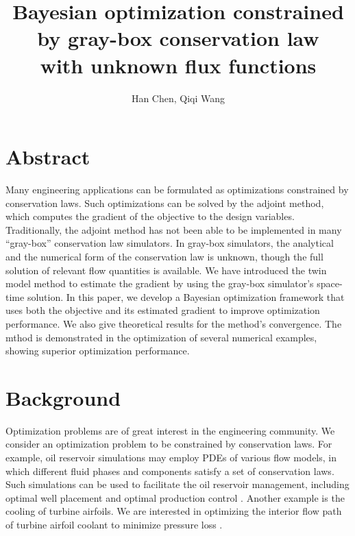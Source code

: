 \documentclass[a4paper,onecolumn]{article}
\theoremstyle{remark}
\begin{document}
\title{Bayesian optimization constrained by gray-box conservation law \\ with unknown
       flux functions}
\author{Han Chen, Qiqi Wang}
\date{}
\maketitle
\section{Abstract}

\indent
Many engineering applications can be formulated as optimizations constrained by conservation laws.
Such optimizations can be solved by the adjoint method, which computes the gradient of the objective
to the design variables.
Traditionally, the adjoint method has not been able to be implemented in many ``gray-box'' conservation law
simulators. In gray-box simulators, the analytical and the numerical form of the conservation law is unknown,
though the full solution of relevant flow quantities is available.
We have introduced the twin model method to estimate the gradient by using the gray-box simulator's space-time
solution.
In this paper, we develop a Bayesian optimization framework that uses both the objective and its estimated gradient
to improve optimization performance.
We also give theoretical results for the method's convergence.
The mthod is demonstrated in the optimization of several numerical examples, showing superior optimization performance.


\section{Background}
\label{background}
\noindent Optimization problems are of great interest in the engineering community. We consider an 
optimization problem to be
constrained by conservation laws.
For example, oil reservoir simulations may employ PDEs of various flow models, 
in which different fluid phases and components satisfy a set of conservation laws.
Such simulations can be used to facilitate the oil reservoir management,
including optimal well placement \cite{adjoint well placement} 
and optimal production control \cite{water flooding control,first reservoir opt}.
Another example is the cooling of turbine airfoils. 
We are interested in optimizing the interior flow path
of turbine airfoil coolant to minimize pressure loss
\cite{ubend rans opt 1, ubend rans opt 2}.\\
\end{document}
